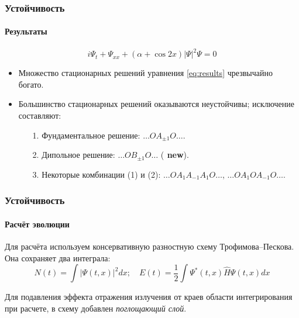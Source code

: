 \documentclass [10pt] {beamer}
\begin{document}
\begin{frame}
	\frametitle{Устойчивость}
	\framesubtitle{Результаты\footnotemark[5]}
	
	\begin{equation}
		i \Psi_t + \Psi_{xx} + (\alpha + \cos 2x) |\Psi|^2 \Psi = 0
		\label{eq:results}	
	\end{equation}
	
	\begin{itemize}
		\item Множество стационарных решений уравнения \eqref{eq:results} чрезвычайно богато.
		\item Большинство стационарных решений оказываются неустойчивы; исключение составляют:
			\begin{enumerate}
				\item[1.] Фундаментальное решение: $\dots O A_{\pm 1} O \dots$.
				\item[2.] Дипольное решение: $\dots O B_{\pm 1} O \dots$ ({\bf {\color{red} new}}).
				\item[3.] Некоторые комбинации {\color{ceruleanblue} (1)} и {\color{ceruleanblue} (2)}: $\dots O A_1 A_{-1} A_1 O \dots$, $\dots O A_1 O A_{-1} O \dots$.
			\end{enumerate}
	\end{itemize}
	
\end{frame}

\begin{frame}
	\frametitle{Устойчивость}
	\framesubtitle{Расчёт эволюции}
	
	Для расчёта используем консервативную разностную схему Трофимова--Пескова\footnotemark[6].
	Она сохраняет два интеграла:
	\begin{equation}
		N(t) = \int |\Psi(t, x)|^2 dx; \quad
		E(t) = \dfrac{1}{2} \int \Psi^*(t, x) \widehat{H} \Psi(t, x) dx
	\end{equation}

	Для подавления эффекта отражения излучения от краев области интегрирования при расчете, в схему добавлен {\it {\color{ceruleanblue} поглощающий слой}}. 
	
\end{frame}
\end{document}
